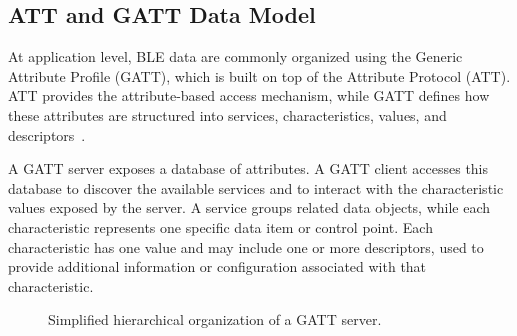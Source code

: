 \subsection{ATT and GATT Data Model}
\label{sec:ble_gatt_data_model}

At application level, BLE data are commonly organized using the Generic Attribute Profile (GATT), which is built on top of the Attribute Protocol (ATT). 
ATT provides the attribute-based access mechanism, while GATT defines how these attributes are structured into services, characteristics, values, and descriptors~\cite{bluetooth_core_gatt}.

A GATT server exposes a database of attributes. 
A GATT client accesses this database to discover the available services and to interact with the characteristic values exposed by the server. 
A service groups related data objects, while each characteristic represents one specific data item or control point. 
Each characteristic has one value and may include one or more descriptors, used to provide additional information or configuration associated with that characteristic.

\begin{figure}[H]
	\centering
	\caption{Simplified hierarchical organization of a GATT server.}
	\label{fig:ble_gatt_data_model}
\end{figure}


